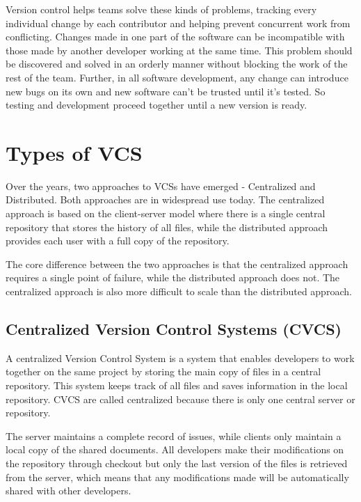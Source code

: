 Version control helps teams solve these kinds of problems, tracking every individual change by each contributor and helping prevent concurrent work from conflicting. Changes made in one part of the software can be incompatible with those made by another developer working at the same time. This problem should be discovered and solved in an orderly manner without blocking the work of the rest of the team. Further, in all software development, any change can introduce new bugs on its own and new software can't be trusted until it's tested. So testing and development proceed together until a new version is ready.
\section{Types of VCS}
Over the years, two approaches to VCSs have emerged - Centralized and Distributed. Both approaches are in widespread use today. The centralized approach is based on the client-server model where there is a single central repository that stores the history of all files, while the distributed approach provides each user with a full copy of the repository.

The core difference between the two approaches is that the centralized approach requires a single point of failure, while the distributed approach does not. The centralized approach is also more difficult to scale than the distributed approach.
\subsection{Centralized Version Control Systems (CVCS)}
A centralized Version Control System is a system that enables developers to work together on the same project by storing the main copy of files in a central repository. This system keeps track of all files and saves information in the local repository. CVCS are called centralized because there is only one central server or repository.

The server maintains a complete record of issues, while clients only maintain a local copy of the shared documents. All developers make their modifications on the repository through checkout but only the last version of the files is retrieved from the server, which means that any modifications made will be automatically shared with other developers.

